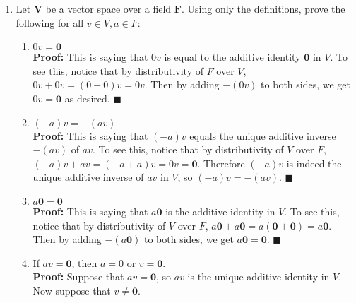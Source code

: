 \documentclass[11pt,twoside]{article}
\newcounter{a}
\begin{document}
\begin{enumerate}
\begin{enumerate}
        \end{enumerate}

        \item Let $\mathbf{V}$ be a vector space over a field $\mathbf{F}$. Using only the definitions, prove the following for all $v \in V, a\in F$:
        \begin{enumerate}
            \item $0v=\mathbf{0}$ \\
            \textbf{Proof:} This is saying that $0v$ is equal to the additive identity $\mathbf{0}$ in $V$. To see this, notice that by distributivity of $F$ over $V$, $0v+0v=(0+0)v=0v$. Then by adding $-(0v)$ to both sides, we get $0v = \mathbf{0}$ as desired. $\blacksquare$
            \item $(-a)v=-(av)$ \\
            \textbf{Proof:} This is saying that $(-a)v$ equals the unique additive inverse $-(av)$ of $av$. To see this, notice that by distributivity of $V$ over $F$, $(-a)v+av=(-a+a)v=0v=\mathbf{0}$. Therefore $(-a)v$ is indeed the unique additive inverse of $av$ in $V$, so $(-a)v=-(av)$. $\blacksquare$
            \item $a\mathbf{0}=\mathbf{0}$ \\
            \textbf{Proof:} This is saying that $a\mathbf{0}$ is the additive identity in $V$. To see this, notice that by distributivity of $V$ over $F$, $a\mathbf{0} + a\mathbf{0}=a(\mathbf{0} + \mathbf{0})=a\mathbf{0}$. Then by adding $-(a\mathbf{0})$ to both sides, we get $a\mathbf{0}=\mathbf{0}$. $\blacksquare$
            \item If $av=\mathbf{0}$, then $a=0$ or $v=\mathbf{0}$. \\
            \textbf{Proof:} Suppose that $av=\mathbf{0}$, so $av$ is the unique additive identity in $V$. Now suppose that $v \ne \mathbf{0}$. 

        \end{enumerate}
        

    \end{enumerate}
\end{document}
